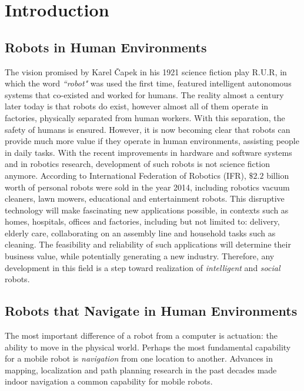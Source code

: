 \chapter{Introduction}
\label{chapter:introduction}

\section{Robots in Human Environments}

The vision promised by Karel \v{C}apek in his 1921 science fiction play R.U.R, in which the word \textit{``robot"} was used the first time, featured intelligent autonomous systems that co-existed and worked for humans. The reality almost a century later today is that robots do exist, however almost all of them operate in factories, physically separated from human workers. With this separation, the safety of humans is ensured. However, it is now becoming clear that robots can provide much more value if they operate in human environments, assisting people in daily tasks. With the recent improvements in hardware and software systems and in robotics research, development of such robots is not science fiction anymore. According to International Federation of Robotics (IFR), $ \$2.2$ billion worth of personal robots were sold in the year 2014, including robotics vacuum cleaners, lawn mowers, educational and entertainment robots. This disruptive technology will make fascinating new applications possible, in contexts such as homes, hospitals, offices and factories, including but not limited to: delivery, elderly care, collaborating on an assembly line and household tasks such as cleaning. The feasibility and reliability of such applications will determine their business value, while potentially generating a new industry. Therefore, any development in this field is a step toward realization of \textit{intelligent} and \textit{social} robots.

\section{Robots that Navigate in Human Environments}

The most important difference of a robot from a computer is actuation: the ability to move in the physical world. Perhaps the most fundamental capability for a mobile robot is \textit{navigation} from one location to another. Advances in mapping, localization and path planning research in the past decades made indoor navigation a common capability for mobile robots. 

